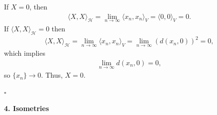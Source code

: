 \documentclass[11pt]{article}
\begin{document}
\begin{enumerate}[(a)]
\begin{itemize}
\begin{enumerate}[(i)]
			
			If $X = 0$, then 
			\begin{align*}
			\langle X,X\rangle_{\mathcal{H}} = \lim_{n\to\infty}\langle x_n,x_n \rangle_V = \langle 0,0\rangle_V = 0.
			\end{align*}
			If $\langle X,X\rangle_\mathcal{H} = 0$ then 
			\begin{align*}
			\langle X,X\rangle_\mathcal{H} =\lim_{n\to\infty}\langle x_n,x_n\rangle_V = \lim_{n\to\infty} (d(x_n,0))^2 =  0,
			\end{align*}
			which implies 
			\begin{align*}
			\lim_{n\to\infty}d(x_n,0) = 0,
			\end{align*}
			so $\{x_n\} \to 0$. Thus, $X = 0$.
		\end{enumerate}		
	\hfill$\square$
		
		
		
		
		
		
		
		
		
		
		
		
		
		
	\end{itemize}
\end{enumerate}



\newpage








\noindent \textbf{4. Isometries}
\end{document}
